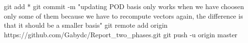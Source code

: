 git add *
git commit -m "updating POD basis only works when we have choosen only some of them because we have to recompute vectors again, the difference is that it should be a smaller basis"
git remote add origin https://github.com/Gabydc/Report_two_phases.git
git push -u origin master
